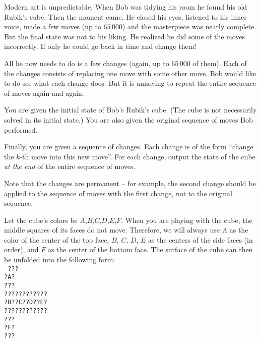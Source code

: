 





Modern art is unpredictable.
When Bob was tidying his room he found his old Rubik's cube.
Then the moment came.
He closed his eyes, listened to his inner voice,
made a few moves (up to $65\,000$) and the masterpiece was nearly complete.
But the final state was not to his liking. He realized he 
did some of the moves incorrectly. If only he could go back in time
and change them!

All he now needs to do is a few changes (again, up to $65\,000$ of them).
Each of the changes consists of replacing one move with some other move.
Bob would like to do see what each change does.
But it is annoying to repeat the entire sequence
of moves again and again.


You are given the initial state of Bob's Rubik's cube.
(The cube is not necessarily solved in its initial state.)
You are also given the original sequence of moves Bob performed.

Finally, you are given a sequence of changes.
Each change is of the form ``change the $k$-th move into this new move''.
For each change, output the state of the cube \emph{at the end} of the
entire sequence of moves.

Note that the changes are permanent -- for example, the second change
should be applied to the sequence of moves with the first change, 
not to the original sequence.


Let the cube's colors be $A$,$B$,$C$,$D$,$E$,$F$.
When you are playing with the cube,
the middle squares of its faces do not move.
Therefore, we will always use $A$
as the color of the center of the top face,
$B$, $C$, $D$, $E$ as the centers of the side faces (in order),
and $F$ as the center of the bottom face.
The surface of the cube can then be unfolded into the following form:\\
\texttt{
???\\
?A?\\
???\\
????????????\\
?B??C??D??E?\\
????????????\\
???\\
?F?\\
???\\
}

